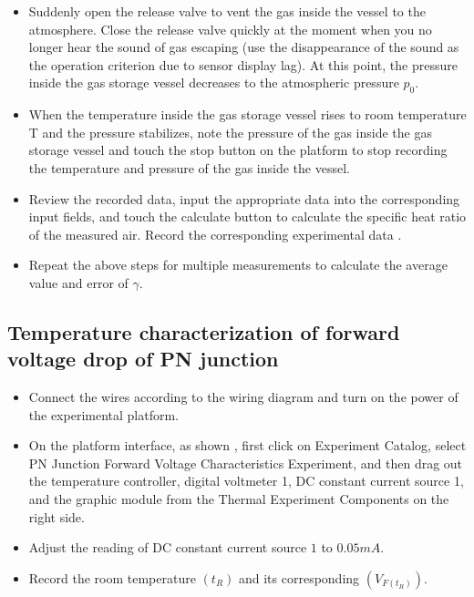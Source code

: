 \documentclass[UTF8]{article}
\begin{document}
	
	\begin{itemize}
	  \item Suddenly open the release valve to vent the gas inside the vessel to the atmosphere. Close the release valve quickly at the moment when you no longer hear the sound of gas escaping (use the disappearance of the sound as the operation criterion due to sensor display lag). At this point, the pressure inside the gas storage vessel decreases to the atmospheric pressure $p_0$.
	  \item When the temperature inside the gas storage vessel rises to room temperature T and the pressure stabilizes, note the pressure of the gas inside the gas storage vessel and touch the stop button on the platform to stop recording the temperature and pressure of the gas inside the vessel.
	  \item Review the recorded data, input the appropriate data into the corresponding input fields, and touch the calculate button to calculate the specific heat ratio of the measured air. Record the corresponding experimental data .
	  \item Repeat the above steps for multiple measurements to calculate the average value and error of $\gamma$.
	\end{itemize}
	
    \subsection{Temperature characterization of forward voltage drop of PN junction}
   
    \begin{itemize}
      \item Connect the wires according to the wiring diagram and turn on the power of the experimental platform.
      \item On the platform interface, as shown , first click on Experiment Catalog, select PN Junction Forward Voltage Characteristics Experiment, and then drag out the temperature controller, digital voltmeter 1, DC constant current source 1, and the graphic module from the Thermal Experiment Components on the right side.
      \item Adjust the reading of DC constant current source $1$ to $0.05mA$.
      \item Record the room temperature $(t_R)$ and its corresponding $(V_{F(t_R)})$.
    \end{itemize}
    
\end{document}
